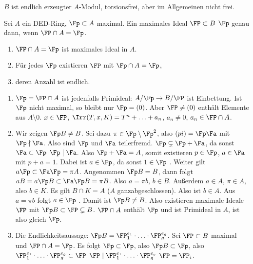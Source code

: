 \begin{Bemerkung}
 $B$ ist endlich erzeugter $A$-Modul, torsionsfrei, aber im Allgemeinen nicht frei.
\end{Bemerkung}

\begin{Definition}
 Sei $A$ ein DED-Ring, $\Fp\subset A$ maximal. Ein maximales Ideal $\FP\subset B$  $\Fp$ genau dann, wenn $\FP\cap A = \Fp$.
\end{Definition}

\begin{Fakt}
 \begin{enumerate}
  \item $\FP\cap A=\Fp$ ist maximales Ideal in $A$.
  \item Für jedes $\Fp$ existieren $\FP$ mit $\Fp\cap A=\Fp$,
  \item deren Anzahl ist endlich.
 \end{enumerate}
\end{Fakt}

\begin{Beweis}
 \begin{enumerate}
  \item $\Fp=\FP\cap A$ ist jedenfalls Primideal: $A/\Fp \rightarrow B/\FP$ ist Einbettung. Ist $\Fp$ nicht maximal, so bleibt nur $\Fp=(0)$. Aber $\FP\neq (0)$ enthält Elemente aus $A\setminus 0$. $x\in\FP$, $\Irr(T,x,K)=T^n+\ldots+a_n$, $a_n\neq 0$, $a_n\in \FP\cap A$.
  \item Wir zeigen $\Fp B\neq B$. Sei dazu $\pi\in\Fp\setminus\Fp^2$, also $(pi)=\Fp\Fa$ mit $\Fp\nmid\Fa$. Also sind $\Fp$ und $\Fa$ teilerfremd. $\Fp\subsetneq \Fp+\Fa$, da sonst $\Fa\subset\Fp$ \folge $\Fp\mid \Fa$. Also $\Fp+\Fa=A$, somit existieren $p\in\Fp$, $a\in\Fa$ mit $p+a=1$. Dabei ist $a\in\Fp$, da sonst $1\in\Fp$ \lightning. Weiter gilt $a\Fp\subset\Fa\Fp=\pi A$. Angenommen $\Fp B= B$, dann folgt $aB=a\Fp B\subset \Fa\Fp B = \pi B$. Also $a=\pi b$, $b\in B$. Außerdem $a\in A$, $\pi\in A$, also $b\in K$. Es gilt $B\cap K=A$ ($A$ ganzabgeschlossen). Also ist $b\in A$. Aus $a=\pi b$ folgt $a\in \Fp$ \lightning.
  Damit ist $\Fp B\neq B$. Also existieren maximale Ideale $\FP$ mit $\Fp B\subset \FP\subsetneq B$. $\FP\cap A$ enthält $\Fp$ und ist Primideal in $A$, ist also gleich $\Fp$.
  \item Die Endlichkeitsaussage: $\Fp B= \FP_1^{e_1}\cdot\ldots\cdot \FP_g^{e_g}$. Sei $\FP\subset B$ maximal und $\FP\cap A=\Fp$. Es folgt $\Fp\subset\Fp$, also $\Fp B\subset \Fp$, also 
  $\FP_1^{e_1}\cdot\ldots\cdot \FP_g^{e_g}\subset \FP$ \folge $\FP \mid \FP_1^{e_1}\cdot\ldots\cdot \FP_g^{e_g}$ \folge $\FP=\FP_i$.
 \end{enumerate}
\end{Beweis}

